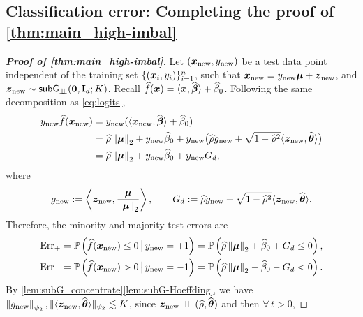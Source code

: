 \subsection{Classification error: Completing the proof of \cref{thm:main_high-imbal}}
\label{subsec:highimb_err}

\begin{proof}[\textbf{Proof of \cref{thm:main_high-imbal}}]
Let $(\text{\boldmath $x$}_\mathrm{new}, y_\mathrm{new})$ be a test data point independent of the training set $\{(\text{\boldmath $x$}_i, y_i)\}_{i=1}^n$, such that $\text{\boldmath $x$}_\mathrm{new} = y_\mathrm{new} \text{\boldmath $\mu$} + \text{\boldmath $z$}_\mathrm{new}$, and $\text{\boldmath $z$}_\mathrm{new} \sim {\sf{subG}_{\perp\!\!\!\perp}}(\mathrm{\bf 0}, \mathrm{\bf I}_d; K)$. Recall $\widehat f(\text{\boldmath $x$}) = \langle \text{\boldmath $x$}, \widehat{{\boldsymbol{\beta}}} \rangle + \widehat\beta_0$. Following the same decomposition as \cref{eq:logits},
\begin{equation*}
    \begin{aligned}
        y_\mathrm{new} \widehat f(\text{\boldmath $x$}_\mathrm{new}) & = y_\mathrm{new} (\langle \text{\boldmath $x$}_\mathrm{new}, \widehat{{\boldsymbol{\beta}}} \rangle + \widehat\beta_0) \\
        & = \widehat\rho \left\|{{\boldsymbol{\mu}}}\right\|_2 + y_\mathrm{new} \widehat\beta_0 + 
        y_\mathrm{new} \bigl(  \widehat\rho g_\mathrm{new} + \sqrt{1 - \widehat\rho^2} \langle \text{\boldmath $z$}_\mathrm{new}, \widehat{{\boldsymbol{\theta}}} \rangle \bigr) \\
        & = \widehat\rho \left\|{{\boldsymbol{\mu}}}\right\|_2 + y_\mathrm{new} \widehat\beta_0 + y_\mathrm{new} G_d,
    \end{aligned}
\end{equation*}
where 
\begin{equation*}
g_\mathrm{new} := \left\langle \text{\boldmath $z$}_\mathrm{new}, \frac{{\boldsymbol{\mu}}}{\left\|{{\boldsymbol{\mu}}}\right\|_2} \right\rangle,
\qquad 
G_d := \widehat\rho g_\mathrm{new} + \sqrt{1 - \widehat\rho^2} \langle \text{\boldmath $z$}_\mathrm{new}, \widehat{{\boldsymbol{\theta}}} \rangle.
\end{equation*}
Therefore, the minority and majority test errors are
\begin{equation*}
    \begin{aligned}
        \mathrm{Err}_+ & = \mathbb{P}\left( \widehat f(\text{\boldmath $x$}_\mathrm{new}) \le 0 \,\big|\, y_\mathrm{new} = +1 \right)
        = \mathbb{P}\left( \widehat\rho \left\|{{\boldsymbol{\mu}}}\right\|_2 + \widehat\beta_0 + G_d \le 0 \right), \\
        \mathrm{Err}_- & = \mathbb{P}\left( \widehat f(\text{\boldmath $x$}_\mathrm{new}) > 0 \,\big|\, y_\mathrm{new} = -1 \right)
        = \mathbb{P}\left( \widehat\rho \left\|{{\boldsymbol{\mu}}}\right\|_2 - \widehat\beta_0 - G_d < 0 \right). \\
    \end{aligned}
\end{equation*}
By \cref{lem:subG_concentrate}\ref{lem:subG-Hoeffding}, we have $\left\|{g_\mathrm{new}}\right\|_{\psi_2}, \| \langle \text{\boldmath $z$}_\mathrm{new}, \widehat{{\boldsymbol{\theta}}} \rangle \|_{\psi_2} \lesssim K$, since $\text{\boldmath $z$}_\mathrm{new} \perp\!\!\!\perp (\widehat\rho, \widehat{{\boldsymbol{\theta}}})$ and then $\forall\, t > 0$,

\end{proof}

